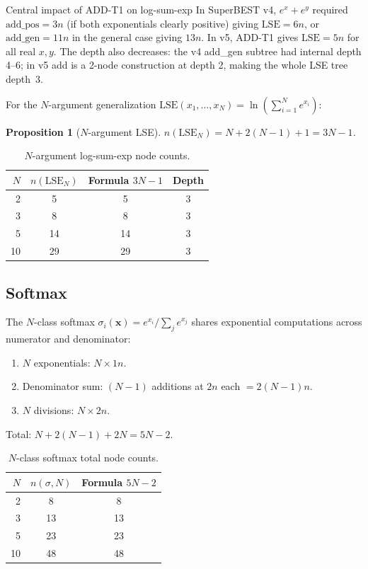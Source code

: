 \documentclass[11pt,a4paper]{article}
\newtheorem{proposition}[theorem]{Proposition}
\begin{document}
\begin{warningbox}{Central impact of ADD-T1 on log-sum-exp}
  In SuperBEST v4, $e^x + e^y$ required $\text{add\_pos} = 3n$ (if both exponentials
  clearly positive) giving $\mathrm{LSE} = 6n$, or $\text{add\_gen} = 11n$ in the general
  case giving $13n$. In v5, ADD-T1 gives $\mathrm{LSE} = 5n$ for all real $x, y$.
  The depth also decreases: the v4 add\_gen subtree had internal depth 4--6; in v5 add is a
  2-node construction at depth 2, making the whole LSE tree depth~3.
\end{warningbox}

For the $N$-argument generalization $\mathrm{LSE}(x_1, \ldots, x_N) = \ln(\sum_{i=1}^N e^{x_i})$:

\begin{proposition}[$N$-argument LSE]
  $n(\mathrm{LSE}_N) = N + 2(N-1) + 1 = 3N - 1$.
\end{proposition}

\begin{table}[h]
\centering
\caption{$N$-argument log-sum-exp node counts.}
\label{tab:lse}
\begin{tabular}{rccc}
\toprule
$N$ & $n(\mathrm{LSE}_N)$ & Formula $3N-1$ & Depth \\
\midrule
2  & 5  & 5  & 3 \\
3  & 8  & 8  & 3 \\
5  & 14 & 14 & 3 \\
10 & 29 & 29 & 3 \\
\bottomrule
\end{tabular}
\end{table}

\subsection{Softmax}

The $N$-class softmax $\sigma_i(\mathbf{x}) = e^{x_i} / \sum_j e^{x_j}$ shares exponential
computations across numerator and denominator:

\begin{enumerate}
  \item $N$ exponentials: $N \times 1n$.
  \item Denominator sum: $(N-1)$ additions at $2n$ each $= 2(N-1)n$.
  \item $N$ divisions: $N \times 2n$.
\end{enumerate}
Total: $N + 2(N-1) + 2N = 5N - 2$.

\begin{table}[h]
\centering
\caption{$N$-class softmax total node counts.}
\label{tab:softmax}
\begin{tabular}{rcc}
\toprule
$N$ & $n(\sigma, N)$ & Formula $5N-2$ \\
\midrule
2  & 8  & 8  \\
3  & 13 & 13 \\
5  & 23 & 23 \\
10 & 48 & 48 \\
\bottomrule
\end{tabular}
\end{table}
\end{document}
